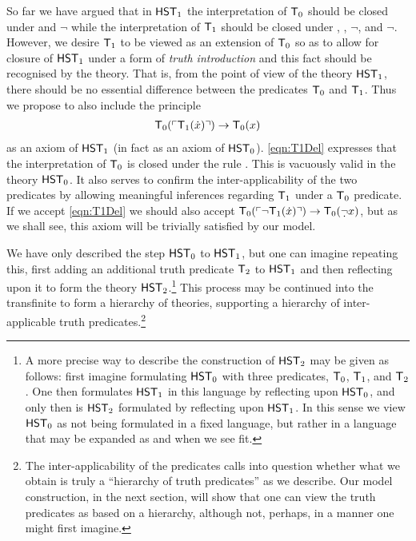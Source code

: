 \documentclass[UKenglish,cleveref,DIV=12]{scrartcl}
\theoremstyle{definition}
\theoremstyle{definition}
\begin{document}
So far we have argued that in $\mathsf{HST}_1$ the interpretation of $\mathsf{T}_0$ should be
closed under  and $\lnot$ while the interpretation of
$\mathsf{T}_1$ should be closed under , , $\lnot$,
 and $\lnot$. However, we desire $\mathsf{T}_1$ to be
viewed as an extension of $\mathsf{T}_0$ so as to allow for closure of $\mathsf{HST}_1$ under a
form of \emph{truth introduction} and this fact should be recognised by the
theory. That is, from the point of view of the theory $\mathsf{HST}_1$, there should be no
essential difference between the predicates $\mathsf{T}_0$ and $\mathsf{T}_1$. Thus we propose to
also include the principle
\begin{gather}\label{eqn:T1Del}
  \mathsf{T}_0(\ulcorner{\mathsf{T}_1(\dot x)}\urcorner)\rightarrow \mathsf{T}_0(x)
\end{gather}
as an axiom of $\mathsf{HST}_1$ (in fact as an axiom of $\mathsf{HST}_0$).
\eqref{eqn:T1Del} expresses that the interpretation of $\mathsf{T}_0$ is closed under
the rule . This is vacuously valid in the theory $\mathsf{HST}_0$. It also
serves to confirm the inter-applicability of the two predicates by allowing
meaningful inferences regarding $\mathsf{T}_1$ under a $\mathsf{T}_0$ predicate. If we accept
\eqref{eqn:T1Del} we should also accept $\T_0(\gn{\lnot \T_1(\dot x)})\rightarrow
\T_0(\dlnot x)$, but as we shall see, this axiom will be trivially satisfied by
our model.


We have only described the step $\mathsf{HST}_0$ to $\mathsf{HST}_1$, but one can imagine repeating
this, first adding an additional truth predicate $\mathsf{T}_2$ to $\mathsf{HST}_1$ and then
reflecting upon it to form the theory $\mathsf{HST}_2$.\footnote{A more precise
way to describe the construction of $\mathsf{HST}_2$ may be given as follows: first imagine formulating $\mathsf{HST}_0$
with three predicates, $\mathsf{T}_0$, $\mathsf{T}_1$, and $\mathsf{T}_2$. One then formulates $\mathsf{HST}_1$ in this
language by reflecting upon $\mathsf{HST}_0$, and only then is $\mathsf{HST}_2$ formulated by reflecting
upon $\mathsf{HST}_1$. In this sense we view $\mathsf{HST}_0$ as not being formulated in a fixed
language, but rather in a language that may be expanded as and when we see fit.} This process may be
continued into the transfinite to form a hierarchy of theories, supporting a
hierarchy of inter-applicable truth predicates.\footnote{The inter-applicability
of the predicates calls into question whether what we obtain is truly a
``hierarchy of truth predicates'' as we describe. Our model construction, in the
next section, will show that one {can} view the truth predicates as based on
a hierarchy, although not, perhaps, in a manner one might first imagine.}
\end{document}
